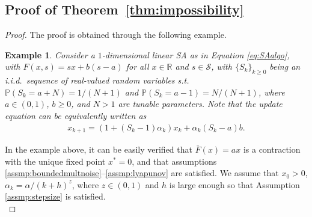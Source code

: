 \documentclass{article}
\newtheorem{example}{Example}[section]
\begin{document}
\subsection{Proof of Theorem~\ref{thm:impossibility} }\label{app:impossibility}
\begin{proof}
The proof is obtained through the following example.

\begin{example}
Consider a $1$-dimensional linear SA as in Equation \eqref{eq:SAalgo}, with $F(x,s)=sx+b(s-a)$ for all $x\in\mathbb{R}$ and $s\in\mathcal{S}$, with $\{S_k\}_{k\geq 0}$ being an i.i.d.\ sequence of real-valued random variables s.t. 
$\mathbb{P}\left(S_k=a+N\right)=1/(N+1)$ and $\mathbb{P}\left(S_k=a-1\right)=N/(N+1)$, where $a\in (0,1)$, $b\geq 0$, and $N>1$ are tunable parameters. Note that the update equation can be equivalently written as
\begin{align}\label{eq:ex1}
    x_{k+1} =(1+(S_k-1)\alpha_k)x_k + \alpha_k (S_k-a) b.
\end{align}
\end{example}

In the example above, it can be easily verified that $\bar{F}(x)=ax$ is a contraction with the unique fixed point $x^*=0$, and that assumptions \ref{assmp:boundedmultnoise}--\ref{assmp:lyapunov} are satisfied. We assume that $x_0>0$, $\alpha_k=\alpha/(k+h)^z$, where $z\in(0,1)$ and $h$ is large enough so that Assumption \ref{assmp:stepsize} is satisfied.\\



\end{proof}
\end{document}
